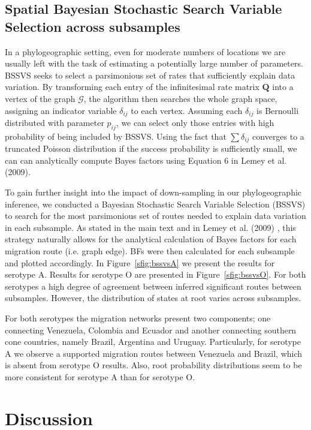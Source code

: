 \documentclass[a4paper,10pt]{article}
\begin{document}
\subsection{Spatial Bayesian Stochastic Search Variable Selection across subsamples}

In a phylogeographic setting, even for moderate numbers of locations we are usually left with the task of estimating a potentially large number of parameters. 
BSSVS seeks to select a parsimonious set of rates that sufficiently explain data variation.
By transforming each entry of the infinitesimal rate matrix $\mathbf{Q}$ into a vertex of the graph $\mathcal{G}$, the algorithm then searches the whole graph space, assigning an indicator variable $\delta_{ij}$ to each vertex.
Assuming each $\delta_{ij}$ is Bernoulli distributed with parameter $p_{ij}$, we can select only those entries with high probability of being included by BSSVS.
Using the fact that $\sum\delta_{ij}$ converges to a truncated Poisson distribution if the success probability is sufficiently small, we can can analytically compute Bayes factors using Equation 6 in Lemey et al. (2009).

To gain further insight into the impact of down-sampling in our phylogeographic inference, we conducted a Bayesian Stochastic Search Variable Selection (BSSVS) to search for the most parsimonious set of routes needed to explain data variation in each subsample.
As stated in the main text and in Lemey et al. (2009) \cite{M-roots}, this strategy naturally allows for the analytical calculation of Bayes factors for each migration route (i.e. graph edge).
BFs were then calculated for each subsample and plotted accordingly.
In Figure~\ref{sfig:bssvsA} we present the results for serotype A.
Results for serotype O are presented in Figure~\ref{sfig:bssvsO}.
For both serotypes a high degree of agreement between inferred significant routes between subsamples.
However, the distribution of states at root varies across subsamples.

For both serotypes the migration networks present two components; one connecting Venezuela, Colombia and Ecuador and another connecting southern cone countries, namely Brazil, Argentina and Uruguay.
Particularly, for serotype A we observe a supported migration routes between Venezuela and Brazil, which is absent from serotype O results.
Also, root probability distributions seem to be more consistent for serotype A than for serotype O.
\section{Discussion}
\newpage
\end{document}
